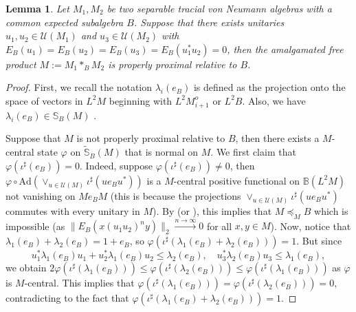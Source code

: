 \documentclass[a4paper, 11pt, reqno]{amsart}
\numberwithin{equation}{section}
\theoremstyle{plain}
\newtheorem{lemma}[thm]{Lemma}
\theoremstyle{remark}
\theoremstyle{definition}
\newcommand{\B}{\mathbb{B}\xspace}
\renewcommand{\S}{\mathbb{S}\xspace}
\begin{document}
\begin{lemma}
    Let $ M_1,M_2 $ be two separable tracial von Neumann algebras with a common expected subalgebra $B$. Suppose that there exists unitaries $ u_1,u_2\in \mathcal{U}(M_1) $ and $u_3 \in \mathcal{U}(M_2)$ with $ E_B(u_1)=E_B(u_2)=E_B(u_3)=E_B(u_1^*u_2)=0 $, then the amalgamated free product $ M:= M_1\ast_B M_2 $ is properly proximal relative to $B$.
\end{lemma}
\begin{proof}
 First, we recall the notation $ \lambda_i(e_B) $ is defined as the projection onto the space of vectors in $L^2M $ beginning with $ L^2M_{i+1}^o $ or $L^2B$. Also, we have $ \lambda_i(e_B) \in \S_{B}(M) $ \cite[Prop. 4.16]{toyosawa2025relative}.

    Suppose that $M$ is not properly proximal relative to $B$, then there exists a $M$-central state $ \varphi $ on $\tilde{\S}_B(M)$ that is normal on $M$. We first claim that $\varphi(\iota^\sharp(e_B))=0$. Indeed, suppose $\varphi(\iota^\sharp(e_B))\neq 0$, then $\varphi\circ \text{Ad}(\vee_{u\in \mathcal{U}(M)} \iota^\sharp(ue_Bu^*))$ is a $M$-central positive functional on $\B(L^2M)$ not vanishing on $ Me_BM $ (this is because the projections $\vee_{u\in \mathcal{U}(M)} \iota^\sharp(ue_Bu^*)$ commutes with every unitary in $M$). By \cite[Lemma 3.3]{OP10b} (or \cite[Theorem 2]{BH18amenableabsorption}), this implies that $ M \preceq_M B $ which is impossible (as $\|E_B(x(u_1u_2)^n y)\|_2\xrightarrow{n\to \infty} 0 $ for all $ x,y \in M $). Now, notice that $ \lambda_1(e_B)+\lambda_2(e_B) = 1+e_B$, so $ \varphi(\iota^\sharp(\lambda_1(e_B)+\lambda_2(e_B))) = 1 $. But since
    $$ u_1^*\lambda_1(e_B)u_1 + u_2^*\lambda_1(e_B)u_2\leq \lambda_2(e_B),\quad u_3^*\lambda_2(e_B)u_3\leq \lambda_1(e_B),$$
    we obtain $ 2\varphi( \iota^\sharp(\lambda_1(e_B))) \leq \varphi(\iota^\sharp(\lambda_2(e_B))) \leq \varphi(\iota^\sharp(\lambda_1(e_B)))$ as $\varphi$ is $M$-central. This implies that $ \varphi(\iota^\sharp(\lambda_1(e_B)))=\varphi(\iota^\sharp(\lambda_2(e_B)))=0 $, contradicting to the fact that $ \varphi(\iota^\sharp(\lambda_1(e_B)+\lambda_2(e_B))) = 1$.
\end{proof}
\end{document}
